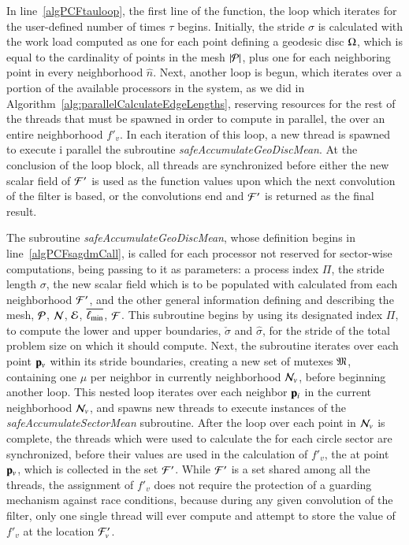 In line~\ref{algPCFtauloop}, the first line of the function, the loop which iterates for the user-defined number of times $\tau$ begins. Initially, the stride $\sigma$ is calculated with the work load computed as one for each point defining a geodesic disc $\Omega$, which is equal to the cardinality of points in the mesh $|\mathcal{P}|$, plus one for each neighboring point in every neighborhood $\hat{n}$. Next, another loop is begun, which iterates over a portion of the available processors in the system, as we did in Algorithm~\ref{alg:parallelCalculateEdgeLengths}, reserving resources for the rest of the threads that must be spawned in order to compute in parallel, the \wmfv{} over an entire neighborhood $f'_v$. In each iteration of this loop, a new thread is spawned to execute i  parallel the subroutine \textit{safeAccumulateGeoDiscMean}. At the conclusion of the loop block, all threads are synchronized before either the new scalar field of  $\mathcal{F}'$ is used as the function values upon which the next convolution of the filter is based, or the convolutions end and $\mathcal{F}'$ is returned as the final result.

The subroutine \textit{safeAccumulateGeoDiscMean}, whose definition begins in line~\ref{algPCFsagdmCall}, is called for each processor not reserved for sector-wise computations, being passing to it as parameters: a process index $\Pi$, the stride length $\sigma$, the new scalar field which is to be populated with calculated  from each neighborhood $\mathcal{F}'$, and the other general information defining and describing the mesh, $\mathcal{P}$, $\mathcal{N}$, $\mathcal{E}$, $\overline{\ell_\text{min}}$, $\mathcal{F}$. This subroutine begins by using its designated index $\Pi$, to compute the lower and upper boundaries, $\check{\sigma}$ and $\hat{\sigma}$, for the stride of the total problem size on which it should compute. Next, the subroutine iterates over each point $\mathbf{p}_v$ within its stride boundaries, creating a new set of mutexes $\mathfrak{M}$, containing one $\mu$ per neighbor in currently neighborhood $\mathcal{N}_v$, before beginning another loop. This nested loop iterates over each neighbor $\mathbf{p}_i$ in the current neighborhood $\mathcal{N}_v$, and spawns new threads to execute instances of the \textit{safeAccumulateSectorMean} subroutine. After the loop over each point in $\mathcal{N}_v$ is complete, the threads which were used to calculate the  for each circle sector are synchronized, before their values are used in the calculation of $f'_v$, the \wmfv{} at point $\mathbf{p}_v$, which is collected in the set $\mathcal{F}'$. While $\mathcal{F}'$ is a set shared among all the threads, the assignment of $f'_v$ does not require the protection of a guarding mechanism against race conditions, because during any given convolution of the filter, only one single thread will ever compute and attempt to store the value of $f'_v$ at the location $\mathcal{F}'_v$.

